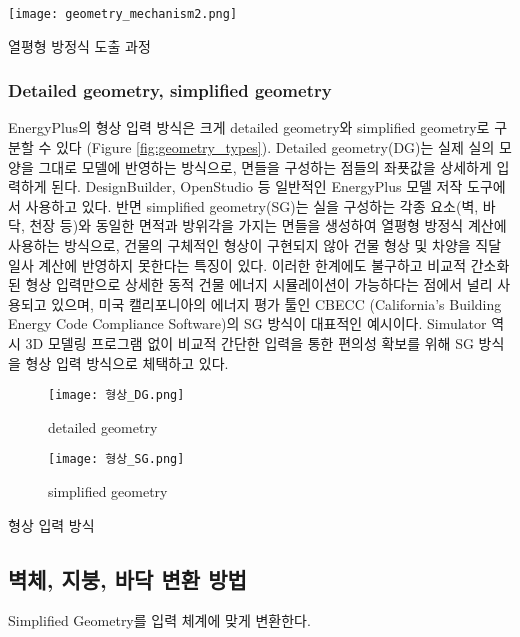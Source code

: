 \begin{defaultfigure}
  \texttt{[image: geometry\_mechanism2.png]}
  \caption{열평형 방정식 도출 과정}
  \label{fig:geometry_mechanism2}
\end{defaultfigure}

\subsubsection{Detailed geometry, simplified geometry}

EnergyPlus의 형상 입력 방식은 크게 detailed geometry와 simplified geometry로 구분할 수 있다 (Figure \ref{fig:geometry_types}). Detailed geometry(DG)는 실제 실의 모양을 그대로 모델에 반영하는 방식으로, 면들을 구성하는 점들의 좌푯값을 상세하게 입력하게 된다. DesignBuilder, OpenStudio 등 일반적인 EnergyPlus 모델 저작 도구에서 사용하고 있다. 반면 simplified geometry(SG)는 실을 구성하는 각종 요소(벽, 바닥, 천장 등)와 동일한 면적과 방위각을 가지는 면들을 생성하여 열평형 방정식 계산에 사용하는 방식으로, 건물의 구체적인 형상이 구현되지 않아 건물 형상 및 차양을 직달 일사 계산에 반영하지 못한다는 특징이 있다. 이러한 한계에도 불구하고 비교적 간소화된 형상 입력만으로 상세한 동적 건물 에너지 시뮬레이션이 가능하다는 점에서 널리 사용되고 있으며, 미국 캘리포니아의 에너지 평가 툴인 CBECC (California's Building Energy Code Compliance Software)의 SG 방식\cite{cbecc}이 대표적인 예시이다. Simulator 역시 3D 모델링 프로그램 없이 비교적 간단한 입력을 통한 편의성 확보를 위해 SG 방식을 형상 입력 방식으로 체택하고 있다.

\begin{defaultfigure}
  
  \begin{subfigure}[b]{0.45\textwidth}
    \centering
    \texttt{[image: 형상\_DG.png]}
    \caption{detailed geometry}
  \end{subfigure}
  \hfill
  \begin{subfigure}[b]{0.45\textwidth}
    \centering
    \texttt{[image: 형상\_SG.png]}
    \caption{simplified geometry}
  \end{subfigure}
  
  \caption{형상 입력 방식}
  \label{fig:geometry_types}

\end{defaultfigure}

\subsection{벽체, 지붕, 바닥 변환 방법}
Simplified Geometry를 \ep 입력 체계에 맞게 변환한다.

